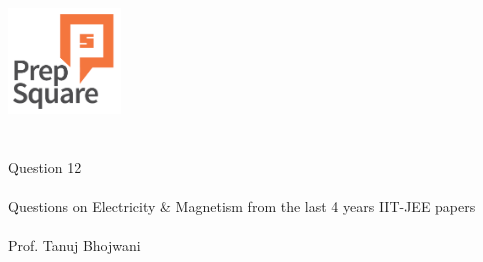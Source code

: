 \documentclass{beamer}
\begin{document}
\begin{center}
\ \\ \ \\
\includegraphics[width=30mm]{Logo-final.png} \\
\ \\ \ \\ 
{\huge Question 12 \\ \ \\ }
{\Large
Questions on Electricity \& Magnetism from the last 4 years IIT-JEE papers
}
{\large \ \\ \ \\ Prof. Tanuj Bhojwani }
\end{center}
\end{document}

